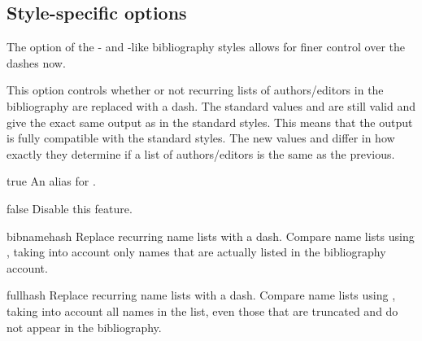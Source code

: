 \documentclass[DIV=9]{scrartcl}
\begin{document}
\subsection{Style-specific options}\label{sec:opt:style}
The  option of the - and -like
bibliography styles allows for finer control over the dashes now.
\begin{optionlist}

This option controls whether or not recurring lists of authors/editors in the
bibliography are replaced with a dash.
The standard values  and  are still valid and give the
exact same output as in the standard styles.
This means that the output is fully compatible with the standard styles.
The new values  and  differ in how exactly they
determine if a list of authors/editors is the same as the previous.
\begin{valuelist}
\item[true] An alias for .
\item[false] Disable this feature.
\item[bibnamehash] Replace recurring name lists with a dash.
                   Compare name lists using , taking
                   into account only names that are actually listed in the
                   bibliography account.
\item[fullhash] Replace recurring name lists with a dash.
                Compare name lists using , taking into
                account all names in the list, even those that are truncated
                and do not appear in the bibliography.
\end{valuelist}



\end{optionlist}
\end{document}
